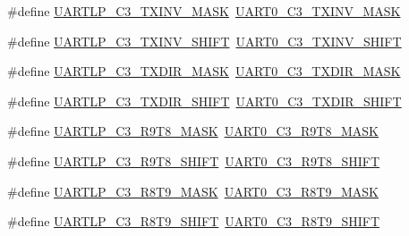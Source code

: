\begin{DoxyCompactItemize}
\item 
\#define \hyperlink{group___backward___compatibility___symbols_gad07163dc482ca87cdab056c680c081c2}{U\+A\+R\+T\+L\+P\+\_\+\+C3\+\_\+\+T\+X\+I\+N\+V\+\_\+\+M\+A\+SK}~\hyperlink{group___u_a_r_t0___register___masks_gaead58bbfecceef15fc563180b19dea48}{U\+A\+R\+T0\+\_\+\+C3\+\_\+\+T\+X\+I\+N\+V\+\_\+\+M\+A\+SK}
\item 
\#define \hyperlink{group___backward___compatibility___symbols_gac43e73179815a02e03de14d95c1d29f0}{U\+A\+R\+T\+L\+P\+\_\+\+C3\+\_\+\+T\+X\+I\+N\+V\+\_\+\+S\+H\+I\+FT}~\hyperlink{group___u_a_r_t0___register___masks_ga7866d64fd9c0f5acb07399d3d575902f}{U\+A\+R\+T0\+\_\+\+C3\+\_\+\+T\+X\+I\+N\+V\+\_\+\+S\+H\+I\+FT}
\item 
\#define \hyperlink{group___backward___compatibility___symbols_ga95dff3853a66ebeee996b014536f86bf}{U\+A\+R\+T\+L\+P\+\_\+\+C3\+\_\+\+T\+X\+D\+I\+R\+\_\+\+M\+A\+SK}~\hyperlink{group___u_a_r_t0___register___masks_gae1d9928e86dff5aff4ba866ce4c26476}{U\+A\+R\+T0\+\_\+\+C3\+\_\+\+T\+X\+D\+I\+R\+\_\+\+M\+A\+SK}
\item 
\#define \hyperlink{group___backward___compatibility___symbols_gacb749efddf2ff0881a30fa3b0b0fd6ec}{U\+A\+R\+T\+L\+P\+\_\+\+C3\+\_\+\+T\+X\+D\+I\+R\+\_\+\+S\+H\+I\+FT}~\hyperlink{group___u_a_r_t0___register___masks_ga8fd1bcbe36bf2b15e1f5bcd945271fd5}{U\+A\+R\+T0\+\_\+\+C3\+\_\+\+T\+X\+D\+I\+R\+\_\+\+S\+H\+I\+FT}
\item 
\#define \hyperlink{group___backward___compatibility___symbols_gaad5e79813f247fac083e627e4125a1b0}{U\+A\+R\+T\+L\+P\+\_\+\+C3\+\_\+\+R9\+T8\+\_\+\+M\+A\+SK}~\hyperlink{group___u_a_r_t0___register___masks_gafa2d2629bdfbedfd82f87d7abe60ef25}{U\+A\+R\+T0\+\_\+\+C3\+\_\+\+R9\+T8\+\_\+\+M\+A\+SK}
\item 
\#define \hyperlink{group___backward___compatibility___symbols_gaaffea46f675353dc12aa3b19a9da33b0}{U\+A\+R\+T\+L\+P\+\_\+\+C3\+\_\+\+R9\+T8\+\_\+\+S\+H\+I\+FT}~\hyperlink{group___u_a_r_t0___register___masks_gac12f14417be540ea9b0a593ff16ab0cc}{U\+A\+R\+T0\+\_\+\+C3\+\_\+\+R9\+T8\+\_\+\+S\+H\+I\+FT}
\item 
\#define \hyperlink{group___backward___compatibility___symbols_gabe3e5842a9d28fcc4699ab569b79d2d6}{U\+A\+R\+T\+L\+P\+\_\+\+C3\+\_\+\+R8\+T9\+\_\+\+M\+A\+SK}~\hyperlink{group___u_a_r_t0___register___masks_ga97ddd31ea21c76d2e25425f34a5ceeae}{U\+A\+R\+T0\+\_\+\+C3\+\_\+\+R8\+T9\+\_\+\+M\+A\+SK}
\item 
\#define \hyperlink{group___backward___compatibility___symbols_gadd1520225db488c74cb9f850c1bf1e99}{U\+A\+R\+T\+L\+P\+\_\+\+C3\+\_\+\+R8\+T9\+\_\+\+S\+H\+I\+FT}~\hyperlink{group___u_a_r_t0___register___masks_ga18a7c7bb418d9b5cf9149d7feb365da3}{U\+A\+R\+T0\+\_\+\+C3\+\_\+\+R8\+T9\+\_\+\+S\+H\+I\+FT}

\end{DoxyCompactItemize}
